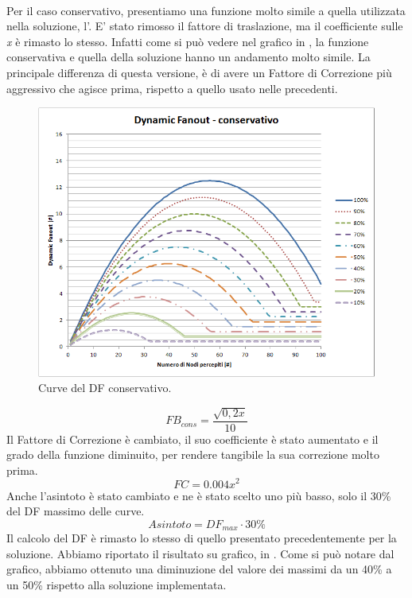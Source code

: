 \\
Per il caso conservativo, presentiamo una funzione molto simile a quella utilizzata nella soluzione, l'. E' stato rimosso il fattore di traslazione, ma il coefficiente sulle \textit{x} è rimasto lo stesso. Infatti come si può vedere nel grafico in , la funzione conservativa e quella della soluzione hanno un andamento molto simile. La principale differenza di questa versione, è di avere un Fattore di Correzione più aggressivo che agisce prima, rispetto a quello usato nelle precedenti.
\begin{figure}[t]
	\centering
	\includegraphics[width=0.9\linewidth]{Images/grafici_usati/DF_conservativo_tot_no_arr}
	\caption[Curve del DF conservativo]{Curve del \acs{DF} conservativo.}
	\label{fig:DF_conservativo_tot_no_arr}
\end{figure}
\begin{equation}
	FB_{cons}=\dfrac{\sqrt{0,2x}}{10}\nonumber
\end{equation}
Il Fattore di Correzione è cambiato, il suo coefficiente è stato aumentato e il grado della funzione diminuito, per rendere tangibile la sua correzione molto prima.
\begin{equation}
	FC = 0.004x^2
\end{equation}
Anche l'asintoto è stato cambiato e ne è stato scelto uno più basso, solo il 30\% del \acs{DF} massimo delle curve.
\begin{equation}
	Asintoto = DF_{max}\cdot 30\%
\end{equation}
Il calcolo del \acs{DF} è rimasto lo stesso di quello presentato precedentemente per la soluzione. Abbiamo riportato il risultato su grafico, in . Come si può notare dal grafico, abbiamo ottenuto una diminuzione del valore dei massimi da un 40\% a un 50\% rispetto alla soluzione implementata.
\bigskip

